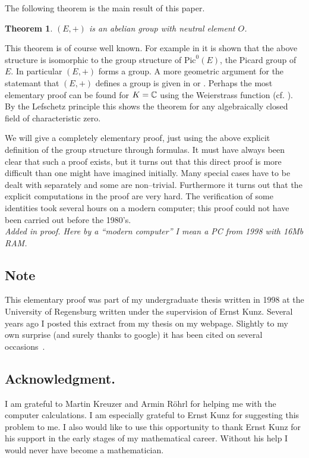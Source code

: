 \documentclass[12pt]{amsart}
\theoremstyle{plain}
\newtheorem{theorem}{Theorem}[section]
\theoremstyle{remark}
\theoremstyle{definition}
\def \C {\mathbf{C}}
\def\C{\Bbb{C}}
\begin{document}
The following theorem is the main result of this paper.

\begin{theorem}
$(E,+)$ is an abelian group
with neutral element $O$.
\end{theorem}



This theorem is of course well known. For example in \cite{Si86} it is shown that the above
structure is isomorphic to the group structure of $\mbox{Pic}^0(E)$, the Picard group of $E$. In particular
$(E,+)$ forms a group. A more geometric argument for the statemant that $(E,+)$ defines a group
is given in \cite[p. 87]{Ku95} or \cite{Hu87}.
Perhaps the most elementary proof can be found for $K=\C$ using the Weierstrass function (cf. \cite{La78}).
By the Lefschetz principle this shows the theorem for any algebraically closed field of characteristic zero.

We will give a completely elementary proof, just using the above explicit definition
of the group structure through formulas.
It must have always been  clear that such a proof exists, but it turns out that
this direct proof is more difficult than one might have imagined initially.
Many special cases have to be dealt with separately and some are non--trivial.
Furthermore it turns out that the explicit computations in the proof are very hard.
The verification of some identities took several hours on a modern computer; this proof
could not have been carried out before the 1980's.\\

\emph{Added in proof. Here by a ``modern computer'' I mean a PC from 1998 with 16Mb RAM. }



\subsection*{Note}
This elementary proof was part of my undergraduate thesis written in 1998
at the University of Regensburg written under the supervision of Ernst Kunz. Several years ago I posted this extract from my thesis on my webpage. Slightly to my own surprise (and surely thanks to google) it has been cited on several occasions~\cite{Th07,TH07,Ha16,Ru,Ru17}.

\subsection*{Acknowledgment.} 
I am grateful to Martin Kreuzer and Armin R\"ohrl for helping me with the computer calculations. 
I am especially grateful to Ernst Kunz for suggesting this problem to me. I also would like to use this opportunity to thank Ernst Kunz for his  support in the early stages of my mathematical career. Without his help I would never have become a mathematician.
\end{document}
